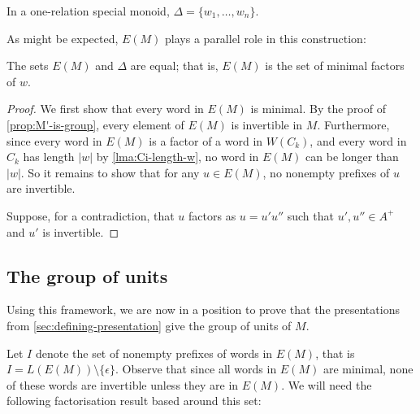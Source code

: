 \documentclass[noindex,noinsetproof,12pt]{lmaths}
\begin{document}
\begin{lemma}
	In a one-relation special monoid, $\Delta = \{w_1, \ldots, w_n\}$. \incomplete
\end{lemma}

As might be expected, $E(M)$ plays a parallel role in this construction:

\begin{prop}
	The sets $E(M)$ and $\Delta$ are equal; that is, $E(M)$ is the set of minimal factors of $w$. \incomplete
\end{prop}
\begin{proof}
	We first show that every word in $E(M)$ is minimal. By the proof of \cref{prop:M'-is-group}, every element of $E(M)$ is invertible in $M$. Furthermore, since every word in $E(M)$ is a factor of a word in $W(C_k)$, and every word in $C_k$ has length $|w|$ by \cref{lma:Ci-length-w}, no word in $E(M)$ can be longer than $|w|$. So it remains to show that for any $u \in E(M)$, no nonempty prefixes of $u$ are invertible.

	Suppose, for a contradiction, that $u$ factors as $u = u'u''$ such that $u', u'' \in A^+$ and $u'$ is invertible.
\end{proof}


\subsection{The group of units} \label{sec:group-of-units}

Using this framework, we are now in a position to prove that the presentations from \cref{sec:defining-presentation} give the group of units of $M$.

Let $I$ denote the set of nonempty prefixes of words in $E(M)$, that is $I = L(E(M)) \setminus \{\epsilon\}$. Observe that since all words in $E(M)$ are minimal, none of these words are invertible unless they are in $E(M)$. We will need the following factorisation result based around this set:
\end{document}
